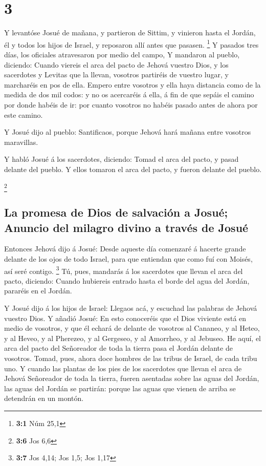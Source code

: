 \hypertarget{section-2}{%
\section{3}\label{section-2}}

 Y levantóse Josué de mañana, y partieron de Sittim, y
vinieron hasta el Jordán, él y todos los hijos de Israel, y reposaron
allí antes que pasasen. \footnote{\textbf{3:1} Núm 25,1}  Y
pasados tres días, los oficiales atravesaron por medio del campo,
 Y mandaron al pueblo, diciendo: Cuando viereis el arca del
pacto de Jehová vuestro Dios, y los sacerdotes y Levitas que la llevan,
vosotros partiréis de vuestro lugar, y marcharéis en pos de ella.
 Empero entre vosotros y ella haya distancia como de la
medida de dos mil codos: y no os acercaréis á ella, á fin de que sepáis
el camino por donde habéis de ir: por cuanto vosotros no habéis pasado
antes de ahora por este camino.

 Y Josué dijo al pueblo: Santificaos, porque Jehová hará
mañana entre vosotros maravillas.

 Y habló Josué á los sacerdotes, diciendo: Tomad el arca del
pacto, y pasad delante del pueblo. Y ellos tomaron el arca del pacto, y
fueron delante del pueblo.

\footnote{\textbf{3:6} Jos 6,6}

\hypertarget{la-promesa-de-dios-de-salvaciuxf3n-a-josuuxe9-anuncio-del-milagro-divino-a-travuxe9s-de-josuuxe9}{%
\subsection{La promesa de Dios de salvación a Josué; Anuncio del milagro
divino a través de
Josué}\label{la-promesa-de-dios-de-salvaciuxf3n-a-josuuxe9-anuncio-del-milagro-divino-a-travuxe9s-de-josuuxe9}}

 Entonces Jehová dijo á Josué: Desde aqueste día comenzaré á
hacerte grande delante de los ojos de todo Israel, para que entiendan
que como fuí con Moisés, así seré contigo. \footnote{\textbf{3:7} Jos
  4,14; Jos 1,5; Jos 1,17}  Tú, pues, mandarás á los
sacerdotes que llevan el arca del pacto, diciendo: Cuando hubiereis
entrado hasta el borde del agua del Jordán, pararéis en el Jordán.

 Y Josué dijo á los hijos de Israel: Llegaos acá, y escuchad
las palabras de Jehová vuestro Dios.  Y añadió Josué: En
esto conoceréis que el Dios viviente está en medio de vosotros, y que él
echará de delante de vosotros al Cananeo, y al Heteo, y al Heveo, y al
Pherezeo, y al Gergeseo, y al Amorrheo, y al Jebuseo.  He
aquí, el arca del pacto del Señoreador de toda la tierra pasa el Jordán
delante de vosotros.  Tomad, pues, ahora doce hombres de
las tribus de Israel, de cada tribu uno.  Y cuando las
plantas de los pies de los sacerdotes que llevan el arca de Jehová
Señoreador de toda la tierra, fueren asentadas sobre las aguas del
Jordán, las aguas del Jordán se partirán: porque las aguas que vienen de
arriba se detendrán en un montón.


